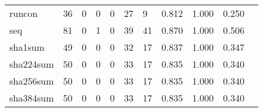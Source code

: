 \begin{longtable}{lp{1.2cm}p{1.2cm}p{1.2cm}p{1.2cm}p{1.2cm}p{1.2cm}p{1.2cm}p{1.2cm}p{1.2cm}p{1.2cm}}
runcon    &                                    36 &                                                  0 &                                                  0 &                                                  0 &                                                 27 &                                                  9 &                                         0.812 &                                              1.000 &                                              0.250 \\
seq       &                                    81 &                                                  0 &                                                  1 &                                                  0 &                                                 39 &                                                 41 &                                         0.870 &                                              1.000 &                                              0.506 \\
sha1sum   &                                    49 &                                                  0 &                                                  0 &                                                  0 &                                                 32 &                                                 17 &                                         0.837 &                                              1.000 &                                              0.347 \\
sha224sum &                                    50 &                                                  0 &                                                  0 &                                                  0 &                                                 33 &                                                 17 &                                         0.835 &                                              1.000 &                                              0.340 \\
sha256sum &                                    50 &                                                  0 &                                                  0 &                                                  0 &                                                 33 &                                                 17 &                                         0.835 &                                              1.000 &                                              0.340 \\
sha384sum &                                    50 &                                                  0 &                                                  0 &                                                  0 &                                                 33 &                                                 17 &                                         0.835 &                                              1.000 &                                              0.340 \\

\end{longtable}
